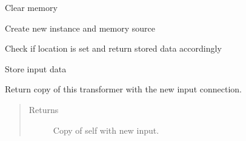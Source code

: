 \documentclass[letterpaper,10pt,english]{sphinxmanual}
\begin{document}
\begin{fulllineitems}
\begin{fulllineitems}
\begin{quote}
\begin{description}
\end{description}\end{quote}

\end{fulllineitems}


\begin{fulllineitems}
\label{\detokenize{dalio.base:dalio.base.memory.Memory.clear}}
Clear memory

\end{fulllineitems}


\begin{fulllineitems}
\label{\detokenize{dalio.base:dalio.base.memory.Memory.copy}}
Create new instance and memory source

\end{fulllineitems}


\begin{fulllineitems}
\label{\detokenize{dalio.base:dalio.base.memory.Memory.run}}
Check if location is set and return stored data accordingly

\end{fulllineitems}


\begin{fulllineitems}
\label{\detokenize{dalio.base:dalio.base.memory.Memory.set_input}}
Store input data

\end{fulllineitems}


\begin{fulllineitems}
\label{\detokenize{dalio.base:dalio.base.memory.Memory.with_input}}
Return copy of this transformer with the new input connection.
\begin{quote}\begin{description}
\item[{Returns}] \leavevmode
Copy of self with new input.


\end{description}
\end{quote}
\end{fulllineitems}
\end{fulllineitems}
\end{document}
